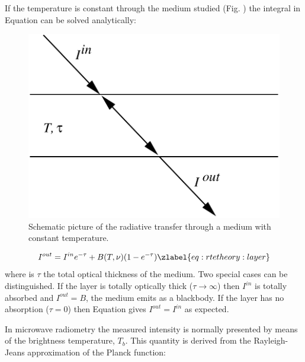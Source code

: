  If the temperature is constant through the medium studied (Fig.
 ) the integral in Equation  can be solved
 analytically:

 \begin{figure}
  \begin{center}
   \begin{minipage}[c]{0.4\textwidth}
    \centering
    \caption{Schematic picture of the radiative transfer through a medium with
             constant temperature.}
   \end{minipage}%
   \hspace{0.05\textwidth}%
   \begin{minipage}[c]{0.50\textwidth}
    \centering
    \includegraphics*[width=0.99\hsize]{fig_layer}
   \end{minipage}
  \end{center}
 \end{figure}   
  
 \begin{equation}
   I^{out} = I^{in}e^{-\tau} + B(T,\nu)(1-e^{-\tau})
  \zlabel{eq:rtetheory:layer}
 \end{equation}  
 where is $\tau$ the total optical thickness of the medium. Two
 special cases can be distinguished. If the layer is totally optically
 thick ($\tau \to \infty$) then $I^{in}$ is totally absorbed and
 $I^{out} = B$, the medium emits as a blackbody. If the layer has no
 absorption ($\tau=0$) then Equation  gives
 $I^{out} = I^{in}$ as expected.
 
 In microwave radiometry the measured intensity is normally presented
 by means of the brightness temperature, $T_b$. This quantity is
 derived from the Rayleigh-Jeans approximation of the Planck function:

